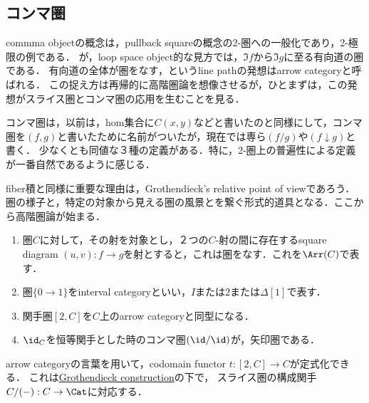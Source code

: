 \documentclass[uplatex,dvipdfmx]{jsreport}
\begin{document}
\subsection{コンマ圏}

\begin{tcolorbox}[colframe=ForestGreen, colback=ForestGreen!10!white, breakable ,colbacktitle=ForestGreen!40!white, coltitle=black,fonttitle=\bfseries\sffamily,
    title=コンマ圏とは，fiber積の概念の関手への昇華であり，従ってline graph的概念である]
    commma objectの概念は，pullback squareの概念の2-圏への一般化であり，2-極限の例である．
    が，loop space object的な見方では，$\Im f$から$\Im g$に至る有向道の圏である．
    有向道の全体が圏をなす，というline pathの発想はarrow categoryと呼ばれる．
    この捉え方は再帰的に高階圏論を想像させるが，ひとまずは，この発想がスライス圏とコンマ圏の応用を生むことを見る．

    コンマ圏は，以前は，hom集合に$C(x,y)$などと書いたのと同様にして，コンマ圏を$(f,g)$と書いたために名前がついたが，現在では専ら$(f/g)$や$(f\downarrow g)$と書く．
    少なくとも同値な３種の定義がある．特に，2-圏上の普遍性による定義が一番自然であるように感じる．

    fiber積と同様に重要な理由は，Grothendieck's relative point of viewであろう．
    圏の様子と，特定の対象から見える圏の風景とを繋ぐ形式的道具となる．ここから高階圏論が始まる．
\end{tcolorbox}

\begin{definition}\mbox{}
    \begin{enumerate}
        \item 圏$C$に対して，その射を対象とし，２つの$C$-射の間に存在するsquare diagram $(u,v):f\to g$を射とすると，これは圏をなす．これを$\Arr(C)$で表す．
        \item 圏$\{0\to 1\}$をinterval categoryといい，$I$または$2$または$\Delta[1]$で表す．
        \item 関手圏$[2,C]$を$C$上のarrow categoryと同型になる．
        \item $\id_C$を恒等関手とした時のコンマ圏$(\id/\id)$が，矢印圏である．
    \end{enumerate}
\end{definition}
\begin{remark}
    arrow categoryの言葉を用いて，codomain functor $t:[2,C]\to C$が定式化できる．
    これは\href{https://ncatlab.org/nlab/show/Grothendieck+construction}{Grothendieck construction}の下で，
    スライス圏の構成関手$C/(-):C\to\Cat$に対応する．
\end{remark}
\end{document}
